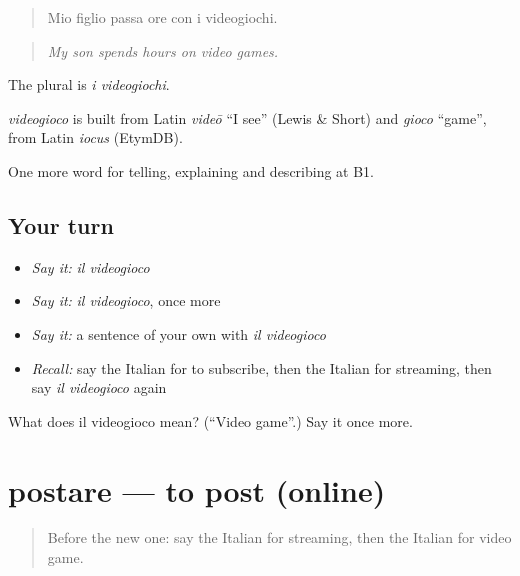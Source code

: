 \begin{quote}
Mio figlio passa ore con i videogiochi.
\end{quote}

\begin{quote}
\emph{My son spends hours on video games.}
\end{quote}

The plural is \emph{i videogiochi}.

\begin{cousinweb}
\emph{videogioco} is built from Latin \emph{videō} \textquotedblleft{}I see\textquotedblright{} (Lewis \& Short) and \emph{gioco} \textquotedblleft{}game\textquotedblright{}, from Latin \emph{iocus} (EtymDB).
\end{cousinweb}

\begin{grammarlens}[title={What you've built}]
One more word for telling, explaining and describing at B1.
\end{grammarlens}

\subsection*{Your turn}
\begin{itemize}
\raggedright
  \item \emph{Say it:} \emph{il videogioco}
  \item \emph{Say it:} \emph{il videogioco}, once more
  \item \emph{Say it:} a sentence of your own with \emph{il videogioco}
  \item \emph{Recall:} say the Italian for to subscribe, then the Italian for streaming, then say \emph{il videogioco} again
\end{itemize}

\begin{tcolorbox}[breakable,colback=teal!4,colframe=teal!35!black,title={Before you move on}]
What does il videogioco mean? (\textquotedblleft{}Video game\textquotedblright{}.) Say it once more.
\end{tcolorbox}
\section[postare]{postare — to post (online)}

\label{lesson:IT-C530-postare}



\begin{quote}
Before the new one: say the Italian for streaming, then the Italian for video game.
\end{quote}

